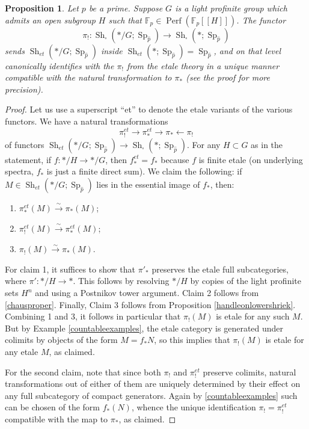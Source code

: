 \documentclass[12pt]{article}
\newtheorem{proposition}[theorem]{Proposition}
\newcommand{\on}{\operatorname}
\newcommand{\solid}{\square}
\newcommand{\wh}{\widehat}
\begin{document}
\begin{proposition}
Let $p$ be a prime.  Suppose $G$ is a light profinite group which admits an open subgroup $H$ such that $\mathbb{F}_p\in \on{Perf}(\mathbb{F}_p[[H]])$.  The functor
$$\pi_!:\on{Sh}_\solid(\ast/G;\on{Sp}_{\wh{p}})\to\on{Sh}_\solid(\ast;\on{Sp}_{\wh{p}})$$
sends $\on{Sh}_{et}(\ast/G;\on{Sp}_{\wh{p}})$ inside $\on{Sh}_{et}(\ast;\on{Sp}_{\wh{p}})=\on{Sp}_{\widehat{p}}$, and on that level canonically identifies with the $\pi_!$ from the etale theory in a unique manner compatible with the natural transformation to $\pi_\ast$ (see the proof for more precision).
\end{proposition}
\begin{proof}
Let us use a superscript ``et'' to denote the etale variants of the various functors.  We have a natural transformations
$$\pi^{et}_!\to\pi^{et}_\ast \to \pi_\ast\leftarrow \pi_!$$
of functors $\on{Sh}_{et}(\ast/G;\on{Sp}_{\wh{p}})\to \on{Sh}_\solid(\ast;\on{Sp}_{\wh{p}})$.
For any $H\subset G$ as in the statement, if $f:\ast/H\to\ast/G$, then $f^{et}_\ast=f_\ast$ because $f$ is finite etale (on underlying spectra, $f_\ast$ is just a finite direct sum).  We claim the following: if $M\in \on{Sh}_{et}(\ast/G;\on{Sp}_{\wh{p}})$ lies in the essential image of $f_\ast$, then:
\begin{enumerate}
\item $\pi^{et}_\ast(M)\overset{\sim}{\rightarrow}\pi_\ast(M)$;
\item $\pi^{et}_!(M)\overset{\sim}{\rightarrow}\pi^{et}_\ast(M)$;
\item $\pi_!(M)\overset{\sim}{\rightarrow}\pi_\ast(M)$.
\end{enumerate}
For claim 1, it suffices to show that $\pi'_\ast$ preserves the etale full subcategories, where $\pi':\ast/H\to\ast$.  This follows by resolving $\ast/H$ by copies of the light profinite sets $H^n$ and using a Postnikov tower argument. Claim 2 follows from \ref{chausproper}. Finally, Claim 3 follows from Proposition \ref{handleonlowershriek}.
Combining 1 and 3, it follows in particular that $\pi_!(M)$ is etale for any such $M$.  But by Example \ref{countableexamples}, the etale category is generated under colimits by objects of the form $M=f_\ast N$, so this implies that $\pi_!(M)$ is etale for any etale $M$, as claimed.

For the second claim, note that since both $\pi_!$ and $\pi_!^{et}$ preserve colimits, natural transformations out of either of them are uniquely determined by their effect on any full subcategory of compact generators.  Again by \ref{countableexamples} such can be chosen of the form $f_\ast(N)$, whence the unique identification $\pi_!=\pi_!^{et}$ compatible with the map to $\pi_\ast$, as claimed.
\end{proof}
\end{document}
